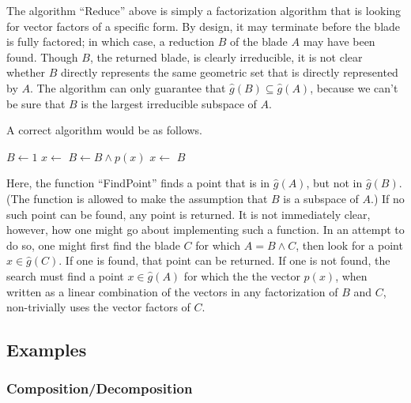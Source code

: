 \documentclass{birkjour}
\theoremstyle{definition}
\theoremstyle{remark}
\numberwithin{equation}{section}
\newcommand{\gh}{\hat{g}}
\begin{document}
The algorithm ``Reduce'' above is simply a factorization algorithm that is looking for
vector factors of a specific form.  By design, it may terminate before the blade is fully factored;
in which case, a reduction $B$ of the blade $A$ may have been found.  Though $B$, the returned blade,
is clearly irreducible, it is not clear whether $B$ directly represents the same geometric set that is
directly represented by $A$.  The algorithm can only guarantee
that $\gh(B)\subseteq\gh(A)$, because we can't be sure that $B$ is the largest irreducible subspace of $A$.

A correct algorithm would be as follows.

\begin{algorithmic}
	\State $B\gets 1$
	\State $x\gets$
		\State $B\gets B\wedge p(x)$
		\State $x\gets$
	\EndWhile
	\State\Return $B$
\EndFunction
\end{algorithmic}
Here, the function ``FindPoint'' finds a point that is in $\gh(A)$, but not in $\gh(B)$.  (The function is allowed to make the assumption that
$B$ is a subspace of $A$.)  If no such point can be
found, any point is returned.  It is not immediately clear, however, how one might go about implementing such a function.
In an attempt to do so, one might first find the blade $C$ for which $A=B\wedge C$, then look for a point $x\in\gh(C)$.
If one is found, that point can be returned.  If one is not found, the search must find a point $x\in\gh(A)$ for which the
the vector $p(x)$, when written as a linear combination of the vectors in any factorization of $B$ and $C$, non-trivially uses
the vector factors of $C$.

\subsection{Examples}

\subsubsection{Composition/Decomposition}
\end{document}
